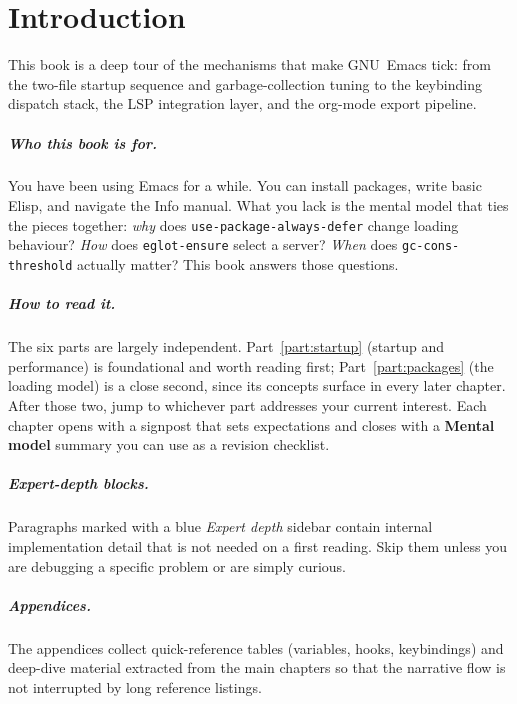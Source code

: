 \chapter*{Introduction}
\label{ch:introduction}

This book is a deep tour of the mechanisms that make GNU~Emacs
tick: from the two-file startup sequence and garbage-collection
tuning to the keybinding dispatch stack, the LSP integration layer,
and the org-mode export pipeline.

\paragraph{Who this book is for.}
You have been using Emacs for a while.  You can install packages,
write basic Elisp, and navigate the Info manual.  What you lack is
the mental model that ties the pieces together: \emph{why} does
\texttt{use-package-always-defer} change loading behaviour?
\emph{How} does \texttt{eglot-ensure} select a server?  \emph{When}
does \texttt{gc-cons-threshold} actually matter?  This book answers
those questions.

\paragraph{How to read it.}
The six parts are largely independent.  Part~\ref{part:startup}
(startup and performance) is foundational and worth reading first;
Part~\ref{part:packages} (the loading model) is a close second,
since its concepts surface in every later chapter.  After those two,
jump to whichever part addresses your current interest.  Each chapter
opens with a signpost that sets expectations and closes with a
\textbf{Mental model} summary you can use as a revision checklist.

\paragraph{Expert-depth blocks.}
Paragraphs marked with a blue \textit{Expert depth} sidebar contain
internal implementation detail that is not needed on a first reading.
Skip them unless you are debugging a specific problem or are simply
curious.

\paragraph{Appendices.}
The appendices collect quick-reference tables (variables, hooks,
keybindings) and deep-dive material extracted from the main chapters
so that the narrative flow is not interrupted by long reference
listings.
